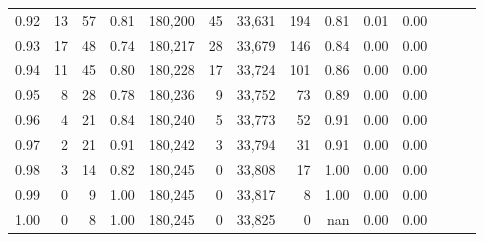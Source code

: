 \begin{tabular}{rrrrrrrrrrrrrr}
0.92 &      13 &   57 &  0.81 &  180,200 &       45 &  33,631 &     194 &  0.81 &  0.01 &      0.00 \\
0.93 &      17 &   48 &  0.74 &  180,217 &       28 &  33,679 &     146 &  0.84 &  0.00 &      0.00 \\
0.94 &      11 &   45 &  0.80 &  180,228 &       17 &  33,724 &     101 &  0.86 &  0.00 &      0.00 \\
0.95 &       8 &   28 &  0.78 &  180,236 &        9 &  33,752 &      73 &  0.89 &  0.00 &      0.00 \\
0.96 &       4 &   21 &  0.84 &  180,240 &        5 &  33,773 &      52 &  0.91 &  0.00 &      0.00 \\
0.97 &       2 &   21 &  0.91 &  180,242 &        3 &  33,794 &      31 &  0.91 &  0.00 &      0.00 \\
0.98 &       3 &   14 &  0.82 &  180,245 &        0 &  33,808 &      17 &  1.00 &  0.00 &      0.00 \\
0.99 &       0 &    9 &  1.00 &  180,245 &        0 &  33,817 &       8 &  1.00 &  0.00 &      0.00 \\
1.00 &       0 &    8 &  1.00 &  180,245 &        0 &  33,825 &       0 &   nan &  0.00 &      0.00 \\
\bottomrule
\end{tabular}

